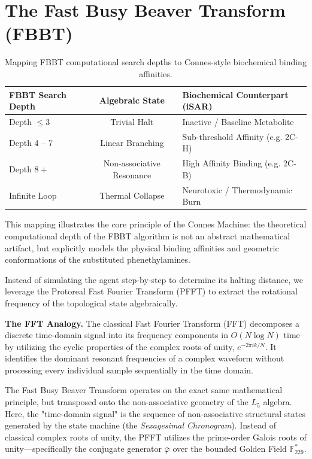 \section{The Fast Busy Beaver Transform (FBBT)}

\begin{table}[ht]
\centering
\begin{tabular}{|l|c|l|}
\hline
\textbf{FBBT Search Depth} & \textbf{Algebraic State} & \textbf{Biochemical Counterpart (iSAR)} \\
\hline
Depth $\leq 3$ & Trivial Halt & Inactive / Baseline Metabolite \\
Depth 4 -- 7 & Linear Branching & Sub-threshold Affinity (e.g. 2C-H) \\
Depth $8+$ & Non-associative Resonance & High Affinity Binding (e.g. 2C-B) \\
Infinite Loop & Thermal Collapse & Neurotoxic / Thermodynamic Burn \\
\hline
\end{tabular}
\caption{Mapping FBBT computational search depths to Connes-style biochemical binding affinities.}
\label{tab:fbbt_biochem}
\end{table}

This mapping illustrates the core principle of the Connes Machine: the theoretical computational depth of the FBBT algorithm is not an abstract mathematical artifact, but explicitly models the physical binding affinities and geometric conformations of the substituted phenethylamines.

Instead of simulating the agent step-by-step to determine its halting distance, we leverage the Protoreal Fast Fourier Transform (PFFT) to extract the rotational frequency of the topological state algebraically. 

\textbf{The FFT Analogy.} The classical Fast Fourier Transform (FFT) decomposes a discrete time-domain signal into its frequency components in $O(N \log N)$ time by utilizing the cyclic properties of the complex roots of unity, $e^{-2\pi i k / N}$. It identifies the dominant resonant frequencies of a complex waveform without processing every individual sample sequentially in the time domain. 

The Fast Busy Beaver Transform operates on the exact same mathematical principle, but transposed onto the non-associative geometry of the $L_5$ algebra. Here, the "time-domain signal" is the sequence of non-associative structural states generated by the state machine (the \textit{Sexagesimal Chronogram}). Instead of classical complex roots of unity, the PFFT utilizes the prime-order Galois roots of unity---specifically the conjugate generator $\bar{\varphi}$ over the bounded Golden Field $\mathbb{F}_{229}^*$. 

